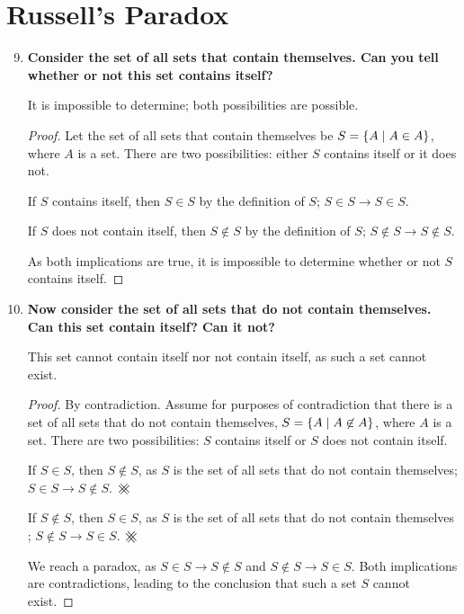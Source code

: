 \documentclass[article, 12pt]{article}
\theoremstyle{definition}
\DeclarePairedDelimiter\set{\{}{\}}
\newcommand\contradiction{\mathbin{\mathpalette\xhash\relax}}
\newcommand{\xhash}[2]{\ooalign{%
  $#1\xxhash{#1}{-45}$\cr
  $#1\xxhash{#1}{45}$\cr
  }%
}
\newcommand{\xxhash}[2]{\rotatebox[origin=c]{#2}{$#1\parallel$}}
\begin{document}
    \section{Russell's Paradox}
        \begin{enumerate}[(1)]
            \setcounter{enumi}{8}
            \item \textbf{Consider the set of all sets that contain themselves. Can you tell whether or not this set contains itself?}
            
            It is impossible to determine; both possibilities are possible.
            \begin{proof}
                Let the set of all sets that contain themselves be $S = \set*{A \mid A \in A}$, where $A$ is a set. There are two possibilities: either $S$ contains itself or it does not. 
                
                If $S$ contains itself, then $S \in S$ by the definition of $S$; $S \in S \to S \in S$. 
                
                If $S$ does not contain itself, then $S \not\in S$ by the definition of $S$; $S \not\in S \to S \not\in S$. 
                
                As both implications are true, it is impossible to determine whether or not $S$ contains itself.
            \end{proof}
            \item \textbf{Now consider the set of all sets that do not contain themselves. Can this set contain itself? Can it not?}
            
            This set cannot contain itself nor not contain itself, as such a set cannot exist.
            \begin{proof}
                By contradiction. Assume for purposes of contradiction that there is a set of all sets that do not contain themselves, $S = \set*{A \mid A \not\in A}$, where $A$ is a set. There are two possibilities: $S$ contains itself or $S$ does not contain itself.
                
                If $S \in S$, then $S \not\in S$, as $S$ is the set of all sets that do not contain themselves; $S \in S \to S \not\in S$. $\contradiction$

                If $S \not\in S$, then $S \in S$, as $S$ is the set of all sets that do not contain themselves ; $S \not\in S \to S \in S$.  $\contradiction$
                
                We reach a paradox, as $S \in S \to S \not\in S$ and $S \not\in S \to S \in S$. Both implications are contradictions, leading to the conclusion that such a set $S$ cannot exist.
            \end{proof}
        \end{enumerate}
\end{document}
